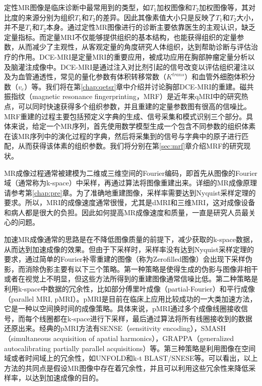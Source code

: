 定性MR图像是临床诊断中最常用到的类型，如$T_1$加权图像和$T_2$加权图像等，其对比度的来源分别为组织$T_1$和$T_2$的差异。因此其像素值大小只是反映了$T_1$和$T_2$大小，并不是$T_1$和$T_2$本身。通过定性MR图像进行的诊断主要依靠医生的主观认识，缺乏定量指标。而定量MRI不仅能够提供组织的基本结构，也能获得组织的定量参数，从而减少了主观性，从客观定量的角度研究人体组织，达到帮助诊断与评估治疗的作用。DCE-MRI\cite{Yankeelov2009}是定量MRI的重要应用，被成功应用在胸部肿瘤定量分析以及脑灌注成像中。DCE-MRI是通过注入对比剂引起的信号改变以评估组织灌注以及为血管通透性，常见的量化参数有体积转移常数（$K^{trans}$）和血管外细胞体积分数（$v_e$）等。我们将在第\ref{chap:qetsr}章中介绍并讨论胸部DCE-MRI的重建。磁共振指纹\cite{mrf}（magnetic resonance fingerprinting，MRF）是近年来qMRI中的研究热点，可以同时快速获得多个组织参数，并且重建的定量参数图有很高的信噪比。MRF重建的过程主要包括预定义字典的生成、信号采集和模式识别三个部分。具体来说，给定一个MR序列，首先使用数学模型生成一个包含不同参数的组织体素在该MR序列中的演化过程的字典，然后将采集到的信号与字典中的原子进行匹配，从而获得该体素的组织参数。我们将分别在第\ref{sec:mrf}章介绍MRF的研究现状。

MR成像过程通常被建模为二维或三维空间的Fourier编码，即首先从图像的Fourier域（通常称为k-space）中采样，再通过算法将图像重建出来。详细的MR成像原理请参考第\ref{chap:pre}章。为了准确地重建图像，采样率需要达到Nyquist采样定理\cite{Nyquist}的要求。所以，MRI的成像速度通常很慢，尤其是dMRI和三维MRI，这对成像设备和病人都是很大的负担。因此如何提高MR成像速度和质量，一直是研究人员最关心的问题。

加速MR成像通常的思路是在不降低图像质量的前提下，减少获取的k-space数据，从而达到加速成像的效果。但由于下采样时，采样率没有达到Nyquist采样定理的要求，通过简单的Fourier补零重建的图像（称为Zerofilled图像）会出现下采样伪影，而消除伪影主要有以下三个策略。第一种策略是使得生成的伪影与图像非相干或者在视觉上不明显\cite{Tsai,Marseille,Greiser}，但这些方法所得到的重建图像通常信噪比低。第二种策略是利用k-space中数据的冗余性，比如部分傅里叶成像\cite{McGibney}（partial-Fourier）和平行成像（parallel MRI, pMRI）。pMRI是目前在临床上应用比较成功的一大类加速方法，它是一种以空间换时间的成像策略。具体来说，pMRI通过多个成像线圈接收信号，而每个线圈都在k-space进行下采样，最后通过算法将所有线圈接收到的数据还原出来。经典的pMRI方法有SENSE（sensitivity encoding）\cite{sense}，SMASH（simultaneous acquisition of apatial harmonics）\cite{smash}，GRAPPA（generalized autocalibrating partially parallel acquisitions）\cite{grappa}等。第三种策略是利用图像在空间域或者时间域上的冗余性，如UNFOLD\cite{Madore}和k-t BLAST/SNESE\cite{Tsao}等。可以看出，以上方法的共同点是假设MR图像中存在着冗余性，并且可以利用这些冗余性来降低采样率，以达到加速成像的目的。

